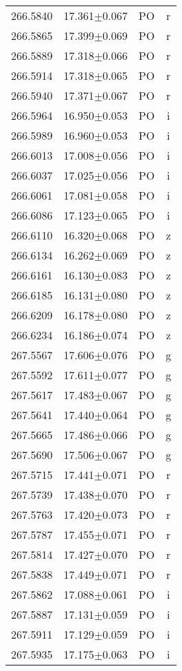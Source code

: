 \begin{table}
\begin{tabular}{cccc}
266.5840 & 17.361$\pm$0.067 & PO & r \\
266.5865 & 17.399$\pm$0.069 & PO & r \\
266.5889 & 17.318$\pm$0.066 & PO & r \\
266.5914 & 17.318$\pm$0.065 & PO & r \\
266.5940 & 17.371$\pm$0.067 & PO & r \\
266.5964 & 16.950$\pm$0.053 & PO & i \\
266.5989 & 16.960$\pm$0.053 & PO & i \\
266.6013 & 17.008$\pm$0.056 & PO & i \\
266.6037 & 17.025$\pm$0.056 & PO & i \\
266.6061 & 17.081$\pm$0.058 & PO & i \\
266.6086 & 17.123$\pm$0.065 & PO & i \\
266.6110 & 16.320$\pm$0.068 & PO & z \\
266.6134 & 16.262$\pm$0.069 & PO & z \\
266.6161 & 16.130$\pm$0.083 & PO & z \\
266.6185 & 16.131$\pm$0.080 & PO & z \\
266.6209 & 16.178$\pm$0.080 & PO & z \\
266.6234 & 16.186$\pm$0.074 & PO & z \\
267.5567 & 17.606$\pm$0.076 & PO & g \\
267.5592 & 17.611$\pm$0.077 & PO & g \\
267.5617 & 17.483$\pm$0.067 & PO & g \\
267.5641 & 17.440$\pm$0.064 & PO & g \\
267.5665 & 17.486$\pm$0.066 & PO & g \\
267.5690 & 17.506$\pm$0.067 & PO & g \\
267.5715 & 17.441$\pm$0.071 & PO & r \\
267.5739 & 17.438$\pm$0.070 & PO & r \\
267.5763 & 17.420$\pm$0.073 & PO & r \\
267.5787 & 17.455$\pm$0.071 & PO & r \\
267.5814 & 17.427$\pm$0.070 & PO & r \\
267.5838 & 17.449$\pm$0.071 & PO & r \\
267.5862 & 17.088$\pm$0.061 & PO & i \\
267.5887 & 17.131$\pm$0.059 & PO & i \\
267.5911 & 17.129$\pm$0.059 & PO & i \\
267.5935 & 17.175$\pm$0.063 & PO & i \\

\end{tabular}
\end{table}

